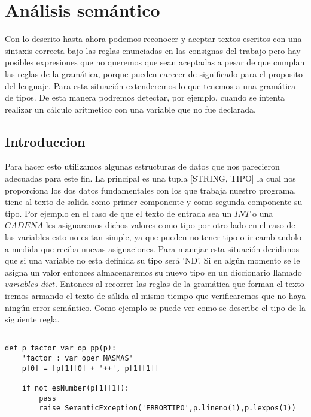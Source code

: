 \section{Análisis semántico}

Con lo descrito hasta ahora podemos reconocer y aceptar textos escritos con una sintaxis correcta bajo las reglas enunciadas en las consignas del trabajo pero hay posibles expresiones que no queremos que sean aceptadas a pesar de que cumplan las reglas de la gramática, porque pueden carecer de significado para el proposito del lenguaje. Para esta situación extenderemos lo que tenemos a una gramática de tipos. De esta manera podremos detectar, por ejemplo, cuando se intenta realizar un cálculo aritmetico con una variable que no fue declarada.


\subsection{Introduccion}

Para hacer esto utilizamos algunas estructuras de datos que nos parecieron adecuadas para este fin. La principal es una tupla [STRING, TIPO] la cual nos proporciona los dos datos fundamentales con los que trabaja nuestro programa, tiene al texto de salida como primer componente y como segunda componente su tipo. Por ejemplo en el caso de que el texto de entrada sea un $INT$ o una $CADENA$ les asignaremos dichos valores como tipo por otro lado en el caso de las variables esto no es tan simple, ya que pueden no tener tipo o ir cambiandolo a medida que reciba nuevas asignaciones. Para manejar esta situación decidimos que si una variable no esta definida su tipo será 'ND'. Si en algún momento se le asigna un valor entonces almacenaremos su nuevo tipo en un diccionario llamado $variables\_dict$. Entonces al recorrer las reglas de la gramática que forman el texto iremos armando el texto de sálida al mismo tiempo que verificaremos que no haya ningún error semántico. Como ejemplo se puede ver como se describe el tipo de la siguiente regla.

\begin{verbatim}

def p_factor_var_op_pp(p):
    'factor : var_oper MASMAS'
    p[0] = [p[1][0] + '++', p[1][1]]

    if not esNumber(p[1][1]):
        pass
        raise SemanticException('ERRORTIPO',p.lineno(1),p.lexpos(1))

\end{verbatim}

